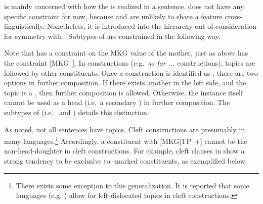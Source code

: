  is mainly concerned with how the  is realized in
a sentence.  does not have any specific constraint for
now, because  and  are unlikely to
share a feature cross-linguistically.
Nonetheless, it is introduced
into the hierarchy out of consideration for symmetry with
.  Subtypes of  are constrained in the
following way.




\noindent Note that  has a constraint on the MKG
value of the mother, just as  above has the constraint
\mbox{[MKG ]}.  In  constructions
(e.g.\ \textit{as for ...}  constructions), topics are followed by
other constituents. Once a construction is identified as
, there are two options in further composition. If
there exists another  in the left side, and the topic is a
, then further composition is allowed. Otherwise,
the  instance itself cannot be used as a head
(i.e.\ a secondary ) in further composition.  The
subtypes of  (i.e.\  and
) details this
distinction.


As noted, not all sentences have topics.
Cleft constructions are presumably  in many
languages.\footnote{There exists some exception to this
  generalization. It is reported that some languages
  (e.g. ) allow for left-dislocated topics in cleft
  constructions.} Accordingly, a constituent with \mbox{[MKG{$\mid$}TP
    +]} cannot be the non-head-daughter in cleft constructions. For
example, cleft clauses in  show a strong tendency to be
exclusive to \onun-marked constituents, as exemplified below.


